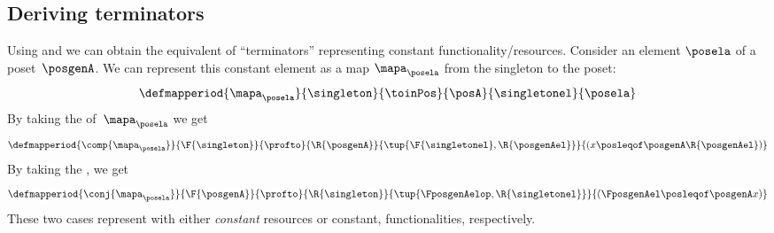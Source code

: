 \subsection{Deriving terminators}
Using  and  we can obtain the equivalent of ``terminators'' representing constant functionality/resources.
Consider an element $\posela$ of a poset~$\posgenA$.
We can represent this constant element as a map $\mapa_{\posela}$ from the singleton to the poset:
%
\begin{equation}
    \defmapperiod{
        \mapa_{\posela}
    }{
        \singleton
    }{
        \toinPos
    }{
        \posA
    }{
        \singletonel
    }{
        \posela
    }
\end{equation}
%
By taking the  of~$\mapa_{\posela}$ we get
%
\begin{equation}
    \defmapperiod{
        \comp{\mapa_{\posela}}
    }{
        \F{\singleton}
    }{
        \profto
    }{
        \R{\posgenA}
    }{
        \tup{\F{\singletonel},\R{\posgenAel}}
    }{
        ( x \posleqof\posgenA \R{\posgenAel})
    }
\end{equation}
By taking the , we get
\begin{equation}
    \defmapperiod{
        \conj{\mapa_{\posela}}
    }{
        \F{\posgenA}
    }{
        \profto
    }{
        \R{\singleton}
    }{
        \tup{\FposgenAelop,\R{\singletonel}}
    }{
        (\FposgenAel\posleqof\posgenA x)
    }
\end{equation}
These two cases represent  with either \emph{constant} resources or constant, functionalities, respectively.
